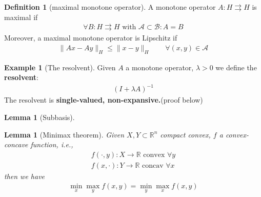 \documentclass[a4paper,12pt,oneside,fleqn]{book}
\newtheorem{lemma}[theorem]{Lemma}
\theoremstyle{definition}
\newtheorem{definition}{Definition}[section]
\newtheorem*{example}{Example}
\theoremstyle{remark}
\begin{document}
\begin{definition}[maximal monotone operator]
	A monotone operator $A: H \rightrightarrows H$ is maximal if 
	\begin{align*}
		\forall B: H \rightrightarrows H \text{ with } \mathcal{A} \subset \mathcal{B}: A = B
	\end{align*} 
	Moreover, a maximal monotone operator is Lipschitz if
	\begin{align*}
		\|Ax - A y \|_H \le \|x - y\|_H \qquad \forall (x, y) \in \mathcal{A}
	\end{align*}
\end{definition}

\begin{example}[The resolvent]
Given $A$ a monotone operator, $\lambda > 0$ we define the \textbf{resolvent}:
\begin{align*}
	(I + \lambda A)^{-1}
\end{align*}
The resolvent is \textbf{single-valued, non-expansive.}(proof below)
\end{example}

\begin{lemma}[Subbasis]
	
\end{lemma}

\begin{lemma}[Minimax theorem]
	Given $X, Y \subset \mathbb{R}^n$ compact convex, $f$ a convex-concave function, i.e., 
	\begin{align*}
		f(\cdot, y): X \rightarrow \mathbb{R} \text{ convex $\forall y$}\\
		f(x, \cdot): Y \rightarrow \mathbb{R} \text{ concav $\forall x$}
	\end{align*}
	then we have
	\begin{align*}
		\min_x \max_y f(x, y) = \min_y \max_x f(x, y)
	\end{align*}
\end{lemma}
\end{document}
